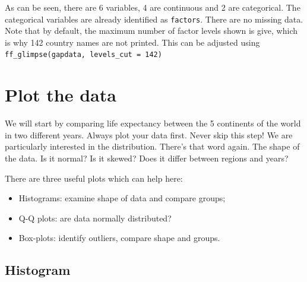 \documentclass[
  12pt,
  krantz2]{krantz}
\makeatletter
\newenvironment{Shaded}{\begin{snugshade}}{\end{snugshade}}
\newcommand{\CommentTok}[1]{\textcolor[rgb]{0.56,0.35,0.01}{\textit{#1}}}
\newcommand{\DataTypeTok}[1]{\textcolor[rgb]{0.13,0.29,0.53}{#1}}
\newcommand{\DecValTok}[1]{\textcolor[rgb]{0.00,0.00,0.81}{#1}}
\newcommand{\KeywordTok}[1]{\textcolor[rgb]{0.13,0.29,0.53}{\textbf{#1}}}
\newcommand{\NormalTok}[1]{#1}
\newcommand{\OperatorTok}[1]{\textcolor[rgb]{0.81,0.36,0.00}{\textbf{#1}}}
\newcommand{\StringTok}[1]{\textcolor[rgb]{0.31,0.60,0.02}{#1}}
\providecommand{\tightlist}{%
  \setlength{\itemsep}{0pt}\setlength{\parskip}{0pt}}
\newenvironment{kframe}{%
\medskip{}
\setlength{\fboxsep}{.8em}
 \def\at@end@of@kframe{}%
 \ifinner\ifhmode%
  \def\at@end@of@kframe{\end{minipage}}%
  \begin{minipage}{\columnwidth}%
 \fi\fi%
 \def\FrameCommand##1{\hskip\@totalleftmargin \hskip-\fboxsep
 \colorbox{shadecolor}{##1}\hskip-\fboxsep
     \hskip-\linewidth \hskip-\@totalleftmargin \hskip\columnwidth}%
 \MakeFramed {\advance\hsize-\width
   \@totalleftmargin\z@ \linewidth\hsize
   \@setminipage}}%
 {\par\unskip\endMakeFramed%
 \at@end@of@kframe}
\renewenvironment{Shaded}{\begin{kframe}}{\end{kframe}}
\makeatother
\begin{document}
As can be seen, there are 6 variables, 4 are continuous and 2 are categorical. The categorical variables are already identified as \texttt{factors}. There are no missing data. Note that by default, the maximum number of factor levels shown is give, which is why 142 country names are not printed. This can be adjusted using \texttt{ff\_glimpse(gapdata,\ levels\_cut\ =\ 142)}

\hypertarget{plot-the-data-1}{%
\section{Plot the data}\label{plot-the-data-1}}

We will start by comparing life expectancy between the 5 continents of the world in two different years.
Always plot your data first.
Never skip this step!
We are particularly interested in the distribution.
There's that word again.
The shape of the data.
Is it normal?
Is it skewed?
Does it differ between regions and years?

There are three useful plots which can help here:

\begin{itemize}
\tightlist
\item
  Histograms: examine shape of data and compare groups;
\item
  Q-Q plots: are data normally distributed?
\item
  Box-plots: identify outliers, compare shape and groups.
\end{itemize}

\hypertarget{chap06-h3-hist-plot}{%
\subsection{Histogram}\label{chap06-h3-hist-plot}}

\begin{Shaded}
\end{Shaded}
\end{document}
